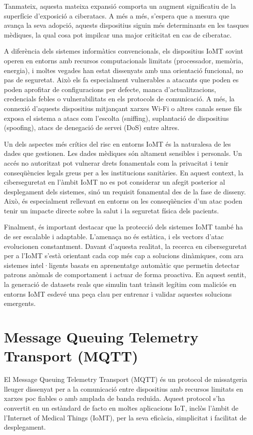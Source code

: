   Tanmateix, aquesta mateixa expansió comporta un augment significatiu de la superfície d’exposició a ciberatacs. A més a més, s’espera que a mesura que avança la seva adopció, aquests dispositius siguin més determinants en les tasques mèdiques, la qual cosa pot impilcar una major criticitat en cas de ciberatac. 
  
  A diferència dels sistemes informàtics convencionals, els dispositius IoMT sovint operen en entorns amb recursos computacionals limitats (processador, memòria, energia), i moltes vegades han estat dissenyats amb una orientació funcional, no pas de seguretat. Això els fa especialment vulnerables a atacants que poden es poden aprofitar de configuracions per defecte, manca d’actualitzacions, credencials febles o vulnerabilitats en els protocols de comunicació. A més, la connexió d’aquests dispositius mitjançant xarxes Wi-Fi o altres canals sense fils exposa el sistema a atacs com l’escolta (sniffing), suplantació de dispositius (spoofing), atacs de denegació de servei (DoS) entre altres. 
  
  Un dels aspectes més crítics del risc en entorns IoMT és la naturalesa de les dades que gestionen. Les dades mèdiques són altament sensibles i personals. Un accés no autoritzat pot vulnerar drets fonamentals com la privacitat i tenir conseqüències legals greus per a les institucions sanitàries. En aquest context, la ciberseguretat en l’àmbit IoMT no es pot considerar un afegit posterior al desplegament dels sistemes, sinó un requisit fonamental des de la fase de disseny. Això, és especialment rellevant en entorns on les conseqüències d’un atac poden tenir un impacte directe sobre la salut i la seguretat física dels pacients.
  
  Finalment, és important destacar que la protecció dels sistemes IoMT també ha de ser escalable i adaptable. L’amenaça no és estàtica, i els vectors d’atac evolucionen constantment. Davant d’aquesta realitat, la recerca en ciberseguretat per a l’IoMT s’està orientant cada cop més cap a solucions dinàmiques, com ara sistemes intel·ligents basats en aprenentatge automàtic que permetin detectar patrons anòmals de comportament i actuar de forma proactiva. En aquest sentit, la generació de datasets reals que simulin tant trànsit legítim com maliciós en entorns IoMT esdevé una peça clau per entrenar i validar aquestes solucions emergents. \cite{IoMTexp}
  
  \section{Message Queuing Telemetry Transport (MQTT)}
  \label{sec:MQTT}
  El Message Queuing Telemetry Transport (MQTT) és un protocol de missatgeria lleuger dissenyat per a la comunicació entre dispositius amb recursos limitats en xarxes poc fiables o amb amplada de banda reduïda. Aquest protocol s’ha convertit en un estàndard de facto en moltes aplicacions IoT, inclòs l’àmbit de l’Internet of Medical Things (IoMT), per la seva eficàcia, simplicitat i facilitat de desplegament.
  
